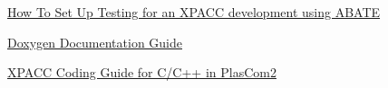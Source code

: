\begin{DoxyItemize}
\item \hyperlink{testingproject_guide}{How To Set Up Testing for an X\+P\+A\+CC development using A\+B\+A\+TE}
\item \hyperlink{xpacc_documentation_guide}{Doxygen Documentation Guide}
\item \hyperlink{xpacc_coding_guide}{X\+P\+A\+CC Coding Guide for C/\+C++ in Plas\+Com2} 
\end{DoxyItemize}